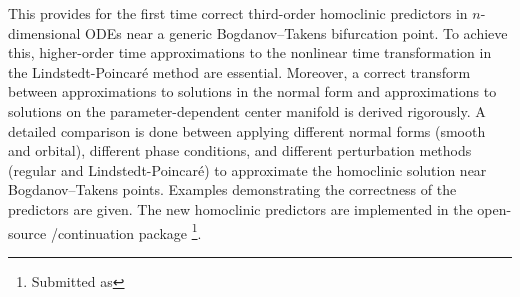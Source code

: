This \paper{} provides for the first time correct third-order homoclinic
predictors in $n$-dimensional ODEs near a generic Bogdanov--Takens bifurcation
point.  To achieve this, higher-order time approximations to the nonlinear time
transformation in the Lindstedt-Poincar\'e method are essential. Moreover, a
correct transform between approximations to solutions in the normal form and
approximations to solutions on the parameter-dependent center manifold is
derived rigorously.  A detailed comparison is done between applying different
normal forms (smooth and orbital), different phase conditions, and different
perturbation methods (regular and Lindstedt-Poincar\'e) to approximate the
homoclinic solution near Bogdanov--Takens points.  Examples demonstrating the
correctness of the predictors are given. The new homoclinic predictors are
implemented in the open-source \MATLAB/\OCTAVE continuation package \MATCONT\ifthesis\footnote{Submitted as}\fi.
